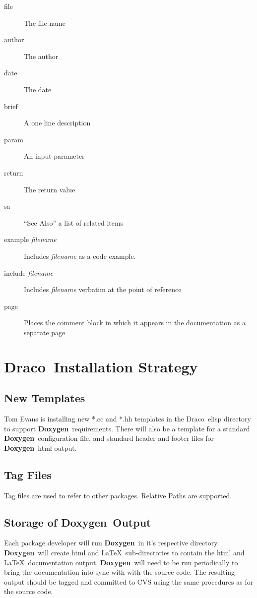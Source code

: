 \documentclass[11pt]{nmemo}
\newcommand{\draco}{{\normalfont\sffamily Draco}}
\newcommand{\doxy}{{\normalfont\bfseries Doxygen}}
\begin{document}
\begin{description}
\item [file] The file name
\item [author] The author
\item [date] The date
\item [brief] A one line description
\item [param] An input parameter
\item [return] The return value
\item [sa] ``See Also'' a list of related items
\item [example {\em filename}] Includes {\em filename} as a code example.
\item [include {\em filename}] Includes {\em filename} verbatim at the point of
  reference
\item [page] Places the comment block in which it appears in the documentation
as a separate page 
\end{description}


\section{\draco\ Installation Strategy}
  \subsection{New Templates}
  Tom Evans is installing new *.cc and *.hh templates in the \draco\ elisp
directory to support \doxy\ requirements. There will also be a
template for a standard \doxy\ configuration file, and standard header
and footer files for \doxy\ html output.
  
\subsection{Tag Files}
Tag files are used to refer to other packages. Relative Paths are supported.

  \subsection{Storage of \doxy\ Output}
Each package developer will run \doxy\ in it's respective directory. 
\doxy\ will create html and \LaTeX\ sub-directories to contain the
html and \LaTeX\ documentation output. \doxy\ will need to be
run periodically to bring the documentation into sync with with the
source code. The resulting output should be tagged and committed to
CVS using the same procedures as for the source code.
\end{document}
